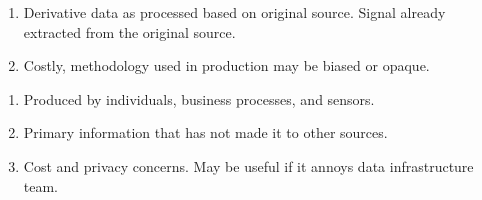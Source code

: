 \begin{remark} 
\begin{enumerate}[label=\roman*.]
\setlength{\itemsep}{0pt}
\item Derivative data as processed based on original source. Signal already extracted from the original source.
\item Costly, methodology used in production may be biased or opaque.
\end{enumerate}
\end{remark}

\begin{remark} 
\begin{enumerate}[label=\roman*.]
\setlength{\itemsep}{0pt}
\item Produced by individuals, business processes, and sensors.
\item Primary information that has not made it to other sources.
\item Cost and privacy concerns. May be useful if it annoys data infrastructure team.
\end{enumerate}
\end{remark}

